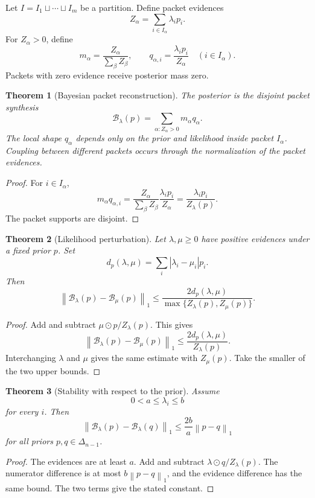 \documentclass{aomart}
\newtheorem{theorem}{Theorem}[section]
\theoremstyle{definition}
\theoremstyle{remark}
\newcommand{\Bcal}{\mathcal B}
\newcommand{\norm}[1]{\left\lVert#1\right\rVert}
\newcommand{\abs}[1]{\left\lvert#1\right\rvert}
\begin{document}
Let \(I=I_1\sqcup\cdots\sqcup I_m\) be a partition. Define packet evidences
\[
Z_\alpha
=
\sum_{i\in I_\alpha}\lambda_ip_i.
\]
For \(Z_\alpha>0\), define
\[
m_\alpha=\frac{Z_\alpha}{\sum_\beta Z_\beta},
\qquad
q_{\alpha,i}=\frac{\lambda_ip_i}{Z_\alpha}
\quad(i\in I_\alpha).
\]
Packets with zero evidence receive posterior mass zero.

\begin{theorem}[Bayesian packet reconstruction]\label{thm:bayesian_packet_reconstruction}
The posterior is the disjoint packet synthesis
\[
\Bcal_\lambda(p)
=
\sum_{\alpha:Z_\alpha>0}
m_\alpha q_\alpha.
\]
The local shape \(q_\alpha\) depends only on the prior and likelihood inside packet \(I_\alpha\). Coupling between different packets occurs through the normalization of the packet evidences.
\end{theorem}

\begin{proof}
For \(i\in I_\alpha\),
\[
m_\alpha q_{\alpha,i}
=
\frac{Z_\alpha}{\sum_\beta Z_\beta}
\frac{\lambda_ip_i}{Z_\alpha}
=
\frac{\lambda_ip_i}{Z_\lambda(p)}.
\]
The packet supports are disjoint.
\end{proof}

\begin{theorem}[Likelihood perturbation]\label{thm:likelihood_perturbation}
Let \(\lambda,\mu\geq0\) have positive evidences under a fixed prior \(p\). Set
\[
d_p(\lambda,\mu)
=
\sum_i\abs{\lambda_i-\mu_i}p_i.
\]
Then
\[
\norm{\Bcal_\lambda(p)-\Bcal_\mu(p)}_1
\leq
\frac{2d_p(\lambda,\mu)}
{\max\{Z_\lambda(p),Z_\mu(p)\}}.
\]
\end{theorem}

\begin{proof}
Add and subtract \(\mu\odot p/Z_\lambda(p)\). This gives
\[
\norm{\Bcal_\lambda(p)-\Bcal_\mu(p)}_1
\leq
\frac{2d_p(\lambda,\mu)}{Z_\lambda(p)}.
\]
Interchanging \(\lambda\) and \(\mu\) gives the same estimate with \(Z_\mu(p)\). Take the smaller of the two upper bounds.
\end{proof}

\begin{theorem}[Stability with respect to the prior]\label{thm:prior_stability}
Assume
\[
0<a\leq\lambda_i\leq b
\]
for every \(i\). Then
\[
\norm{\Bcal_\lambda(p)-\Bcal_\lambda(q)}_1
\leq
\frac{2b}{a}\norm{p-q}_1
\]
for all priors \(p,q\in\Delta_{n-1}\).
\end{theorem}

\begin{proof}
The evidences are at least \(a\). Add and subtract \(\lambda\odot q/Z_\lambda(p)\). The numerator difference is at most \(b\norm{p-q}_1\), and the evidence difference has the same bound. The two terms give the stated constant.
\end{proof}
\end{document}
